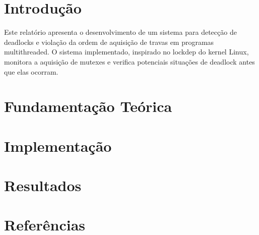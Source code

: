 \documentclass[a4paper,12pt]{report}
\begin{document}







\chapter{Introdução}\label{chap:intro}

Este relatório apresenta o desenvolvimento de um sistema para detecção de deadlocks e violação da ordem de aquisição de travas em programas multithreaded. O sistema implementado, inspirado no lockdep do kernel Linux, monitora a aquisição de mutexes e verifica potenciais situações de deadlock antes que elas ocorram.





\chapter{Fundamentação Teórica}\label{chap:fundamentacao}





\chapter{Implementação}\label{chap:impl}






\chapter{Resultados}\label{chap:results}






\chapter{Referências}\label{chap:refs}


\nocite{*}




\appendix

\end{document}
